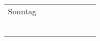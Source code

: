 \documentclass[a4paper]{article}
\begin{document}
\begin{tabular}{lc||p{1.5cm}|p{1.5cm}|p{1.5cm}||p{1.5cm}|p{1.5cm}|p{1.5cm}}
             &         &       &        &          &         &       &      \\
  \midrule
  Sonntag    &         &       &        &          &         &       &      \\
             &         &       &        &          &         &       &      \\
             &         &       &        &          &         &       &      \\
             &         &       &        &          &         &       &      \\
             &         &       &        &          &         &       &      \\
             &         &       &        &          &         &       &      \\
             &         &       &        &          &         &       &      \\
  \bottomrule
\end{tabular}
\end{document}
